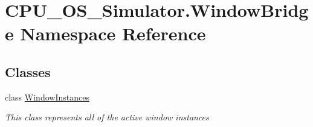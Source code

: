 \hypertarget{namespace_c_p_u___o_s___simulator_1_1_window_bridge}{}\section{C\+P\+U\+\_\+\+O\+S\+\_\+\+Simulator.\+Window\+Bridge Namespace Reference}
\label{namespace_c_p_u___o_s___simulator_1_1_window_bridge}
\subsection*{Classes}
\begin{DoxyCompactItemize}
\item 
class \hyperlink{class_c_p_u___o_s___simulator_1_1_window_bridge_1_1_window_instances}{Window\+Instances}
\begin{DoxyCompactList}\small\item\em This class represents all of the active window instances \end{DoxyCompactList}\end{DoxyCompactItemize}
